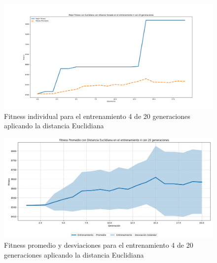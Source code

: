 \documentclass[conference]{IEEEtran}
\begin{document}
\begin{figure}[H]
    \centering
    \includegraphics[width=0.9 \linewidth]{Euclidiana/Fitness_individual_20/Fitness_4_Eucli_20Gen.png}
    \caption{Fitness individual para el entrenamiento 4 de 20 generaciones aplicando la distancia Euclidiana}
    \label{fig:eucli_4_20}
\end{figure}
\begin{figure}[H]
    \centering
    \includegraphics[width=0.9 \linewidth]{Euclidiana/Fitness_individual_20/Fitness_4_Eucli_20Gen_Sombra.png}
    \caption{Fitness promedio y desviaciones para el entrenamiento 4 de 20 generaciones aplicando la distancia Euclidiana}
    \label{fig:eucli_4_20_sombra}
\end{figure}
\end{document}
